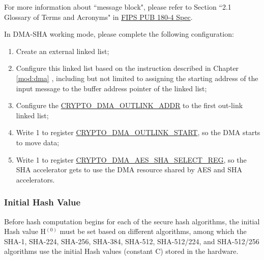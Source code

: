 \documentclass[main\_\_EN.tex]{subfiles}
\begin{document}
\begin{tiplisting}
\vspace{-0.5em}
For more information about ``message block", please refer to Section ``2.1 Glossary of Terms and Acronyms" in \href{https://doi.org/10.6028/NIST.FIPS.180-4}{FIPS PUB 180-4 Spec}.
\end{tiplisting}

In DMA-SHA working mode, please complete the following configuration:
\begin{enumerate}
    \item Create an external linked list;
    \item Configure this linked list based on the instruction described in Chapter \ref{mod:dma} \textit{}, including but not limited to assigning the starting address of the input message to the buffer address pointer of the linked list;
    \item Configure the \hyperref[fielddesc:CRYPTODMAOUTLINKADDR]{CRYPTO\_DMA\_OUTLINK\_ADDR} to the first out-link linked list;
    \item Write 1 to register \hyperref[fielddesc:CRYPTODMAOUTLINKSTART]{CRYPTO\_DMA\_OUTLINK\_START}, so the DMA starts to move data;
    \item Write 1 to register \hyperref[regdesc:CRYPTODMAAESSHASELECTREG]{CRYPTO\_DMA\_AES\_SHA\_SELECT\_REG}, so the SHA accelerator gets to use the DMA resource shared by AES and SHA accelerators.
\end{enumerate}

\subsubsection{Initial Hash Value}\label{initialhash}
Before hash computation begins for each of the secure hash algorithms, the initial Hash value H$^{(0)}$ must be set based on different algorithms, among which the SHA-1, SHA-224, SHA-256, SHA-384, SHA-512, SHA-512/224, and SHA-512/256 algorithms use the initial Hash values (constant C) stored in the hardware.
\end{document}
